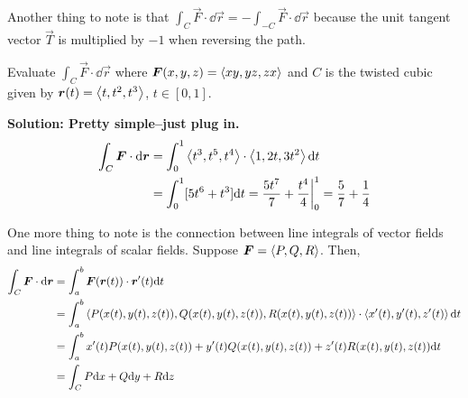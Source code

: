 Another thing to note is that $\int_C \vec F \cdot \dd \vec r = -\int_{-C}\vec F \cdot \dd \vec r$ because the unit tangent vector $\vec T$ is multiplied by $-1$ when reversing the path.
\begin{example}
    Evaluate $\int_C \vec F\cdot \dd \vec r$ where $\boldsymbol{F}(x,y,z) = \left\langle xy, yz, zx\right\rangle$ and $C$ is the twisted cubic given by $\boldsymbol{r}(t) = \left\langle t, t^2, t^3\right\rangle$, $t\in[0,1]$.
    \par\bf{Solution: }Pretty simple--just plug in.
    \begin{align*}
        \int_C\boldsymbol{F} \cdot \dd \boldsymbol{r} &= \int_0^1 \left\langle t^3, t^5, t^4\right\rangle\cdot \left\langle 1, 2t, 3t^2\right\rangle\dd t \\
        &= \int_0^1 [5t^6+t^3]\dd t = \frac{5t^7}{7}+\frac{t^4}{4}\biggr|_0^1 = \frac{5}{7}+\frac{1}{4}
    \end{align*}
\end{example}
One more thing to note is the connection between line integrals of vector fields and line integrals of scalar fields. Suppose $\boldsymbol{F} = \left\langle P,Q,R\right\rangle$. Then,
\begin{align*}
    \int_C \boldsymbol{F} \cdot \dd \boldsymbol{r} &= \int_a^b \boldsymbol{F}(\boldsymbol{r}(t))\cdot \boldsymbol{r}'(t)\dd t \\
    &= \int_a^b \left\langle P(x(t), y(t), z(t)),Q(x(t), y(t), z(t)),R(x(t), y(t), z(t))\right\rangle \cdot \left\langle x'(t), y'(t), z'(t)\right\rangle\dd t \\
    &= \int_a^b x'(t)P(x(t), y(t), z(t)) + y'(t)Q(x(t), y(t), z(t)) + z'(t)R(x(t), y(t), z(t))\dd t \\
    &= \int_C P\dd x + Q\dd y + R \dd z
\end{align*}
